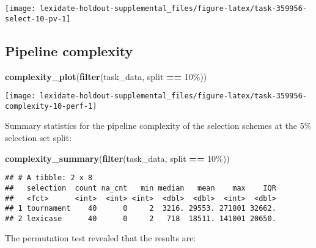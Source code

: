 \documentclass[
]{book}
\newenvironment{Shaded}{\begin{snugshade}}{\end{snugshade}}
\newcommand{\FunctionTok}[1]{\textcolor[rgb]{0.13,0.29,0.53}{\textbf{#1}}}
\newcommand{\NormalTok}[1]{#1}
\newcommand{\SpecialCharTok}[1]{\textcolor[rgb]{0.81,0.36,0.00}{\textbf{#1}}}
\newcommand{\StringTok}[1]{\textcolor[rgb]{0.31,0.60,0.02}{#1}}
\begin{document}
\texttt{[image: lexidate-holdout-supplemental\_files/figure-latex/task-359956-select-10-pv-1]}

\hypertarget{pipeline-complexity-25}{%
\subsection{Pipeline complexity}\label{pipeline-complexity-25}}

\begin{Shaded}
\begin{Highlighting}[]
\FunctionTok{complexity\_plot}\NormalTok{(}\FunctionTok{filter}\NormalTok{(task\_data, split }\SpecialCharTok{==} \StringTok{\textquotesingle{}10\%\textquotesingle{}}\NormalTok{))}
\end{Highlighting}
\end{Shaded}

\texttt{[image: lexidate-holdout-supplemental\_files/figure-latex/task-359956-complexity-10-perf-1]}

Summary statistics for the pipeline complexity of the selection schemes at the 5\% selection set split:

\begin{Shaded}
\begin{Highlighting}[]
\FunctionTok{complexity\_summary}\NormalTok{(}\FunctionTok{filter}\NormalTok{(task\_data, split }\SpecialCharTok{==} \StringTok{\textquotesingle{}10\%\textquotesingle{}}\NormalTok{))}
\end{Highlighting}
\end{Shaded}

\begin{verbatim}
## # A tibble: 2 x 8
##   selection  count na_cnt   min median   mean    max    IQR
##   <fct>      <int>  <int> <int>  <dbl>  <dbl>  <int>  <dbl>
## 1 tournament    40      0     2  3216. 29553. 271801 32662.
## 2 lexicase      40      0     2   718  18511. 141001 20650.
\end{verbatim}

The permutation test revealed that the results are:
\end{document}
